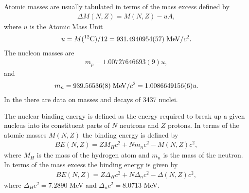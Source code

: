 \documentclass[letterpaper,10pt,english]{sphinxmanual}
\begin{document}
Atomic masses are usually tabulated in terms of the mass excess defined by
\begin{equation*}
\begin{split}
\Delta M(N, Z) =  M(N, Z) - uA,
\end{split}
\end{equation*}
where \(u\) is the Atomic Mass Unit
\begin{equation*}
\begin{split}
u = M(^{12}\mathrm{C})/12 = 931.4940954(57) \hspace{0.1cm} \mathrm{MeV}/c^2.
\end{split}
\end{equation*}
The nucleon masses are
\begin{equation*}
\begin{split}
m_p =  1.00727646693(9)u,
\end{split}
\end{equation*}
and
\begin{equation*}
\begin{split}
m_n = 939.56536(8)\hspace{0.1cm} \mathrm{MeV}/c^2 = 1.0086649156(6)u.
\end{split}
\end{equation*}
In the 
there are data on masses and decays of 3437 nuclei.

The nuclear binding energy is defined as the energy required to break
up a given nucleus into its constituent parts of \(N\) neutrons and \(Z\)
protons. In terms of the atomic masses \(M(N, Z)\) the binding energy is
defined by
\begin{equation*}
\begin{split}
BE(N, Z) = ZM_H c^2 + Nm_n c^2 - M(N, Z)c^2 ,
\end{split}
\end{equation*}
where \(M_H\) is the mass of the hydrogen atom and \(m_n\) is the mass of the neutron.
In terms of the mass excess the binding energy is given by
\begin{equation*}
\begin{split}
BE(N, Z) = Z\Delta_H c^2 + N\Delta_n c^2 -\Delta(N, Z)c^2 ,
\end{split}
\end{equation*}
where \(\Delta_H c^2 = 7.2890\) MeV and \(\Delta_n c^2 = 8.0713\) MeV.
\end{document}
